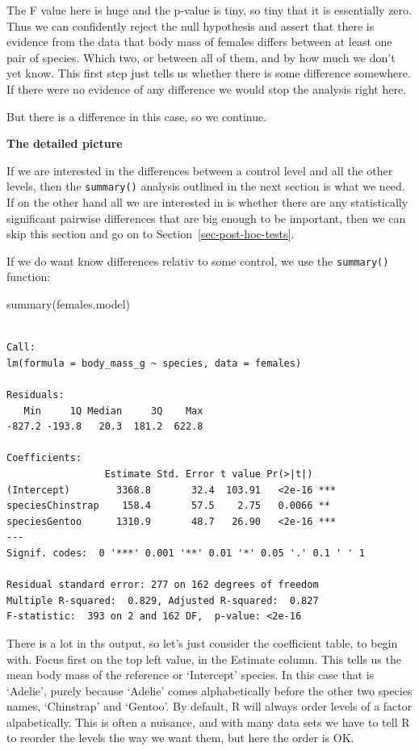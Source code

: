 \documentclass[
  letterpaper,
  DIV=11,
  numbers=noendperiod]{scrreprt}
\newenvironment{Shaded}{\begin{snugshade}}{\end{snugshade}}
\newcommand{\FunctionTok}[1]{\textcolor[rgb]{0.28,0.35,0.67}{#1}}
\newcommand{\NormalTok}[1]{\textcolor[rgb]{0.00,0.23,0.31}{#1}}
\begin{document}
The F value here is huge and the p-value is tiny, so tiny that it is
essentially zero. Thus we can confidently reject the null hypothesis and
assert that there is evidence from the data that body mass of females
differs between at least one pair of species. Which two, or between all
of them, and by how much we don't yet know. This first step just tells
us whether there is some difference somewhere. If there were no evidence
of any difference we would stop the analysis right here.

But there is a difference in this case, so we continue.

\textbf{The detailed picture}

If we are interested in the differences between a control level and all
the other levels, then the \texttt{summary()} analysis outlined in the
next section is what we need. If on the other hand all we are interested
in is whether there are any statistically significant pairwise
differences that are big enough to be important, then we can skip this
section and go on to Section~\ref{sec-post-hoc-tests}.

If we do want know differences relativ to some control, we use the
\texttt{summary()} function:

\begin{Shaded}
\begin{Highlighting}[]
\FunctionTok{summary}\NormalTok{(females.model)}
\end{Highlighting}
\end{Shaded}

\begin{verbatim}

Call:
lm(formula = body_mass_g ~ species, data = females)

Residuals:
   Min     1Q Median     3Q    Max 
-827.2 -193.8   20.3  181.2  622.8 

Coefficients:
                 Estimate Std. Error t value Pr(>|t|)    
(Intercept)        3368.8       32.4  103.91   <2e-16 ***
speciesChinstrap    158.4       57.5    2.75   0.0066 ** 
speciesGentoo      1310.9       48.7   26.90   <2e-16 ***
---
Signif. codes:  0 '***' 0.001 '**' 0.01 '*' 0.05 '.' 0.1 ' ' 1

Residual standard error: 277 on 162 degrees of freedom
Multiple R-squared:  0.829, Adjusted R-squared:  0.827 
F-statistic:  393 on 2 and 162 DF,  p-value: <2e-16
\end{verbatim}

There is a lot in ths output, so let's just consider the coefficient
table, to begin with. Focus first on the top left value, in the Estimate
column. This tells us the mean body mass of the reference or `Intercept'
species. In this case that is `Adelie', purely because `Adelie' comes
alphabetically before the other two species names, `Chinstrap' and
`Gentoo'. By default, R will always order levels of a factor
alpabetically. This is often a nuisance, and with many data sets we have
to tell R to reorder the levels the way we want them, but here the order
is OK.
\end{document}
